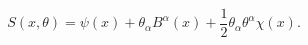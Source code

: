 \begin{equation} 
S(x, \theta) = \psi (x) + \theta_{\alpha} B^{\alpha} (x) + \frac{1}{2} 
\theta_{\alpha} \theta^{\alpha} \chi (x) . 
\end{equation} 
